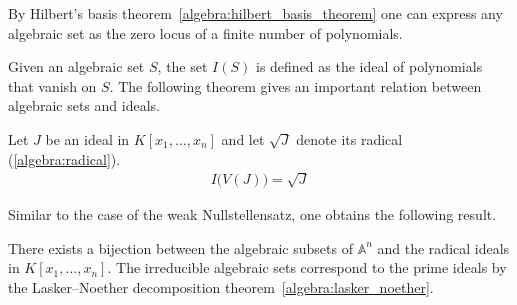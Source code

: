     \begin{property}
        By Hilbert's basis theorem~\ref{algebra:hilbert_basis_theorem} one can express any algebraic set as the zero locus of a finite number of polynomials.
    \end{property}

    Given an algebraic set $S$, the set $I(S)$ is defined as the ideal of polynomials that vanish on $S$. The following theorem gives an important relation between algebraic sets and ideals.
    \begin{theorem}
        Let $J$ be an ideal in $K[x_1,\ldots,x_n]$ and let $\sqrt{J}$ denote its radical (\cref{algebra:radical}).
        \begin{gather}
            I\bigl(V(J)\bigr) = \sqrt{J}
        \end{gather}
    \end{theorem}
    Similar to the case of the weak Nullstellensatz, one obtains the following result.
    \begin{result}
        There exists a bijection between the algebraic subsets of $\mathbb{A}^n$ and the radical ideals in $K[x_1,\ldots,x_n]$. The irreducible algebraic sets correspond to the prime ideals by the Lasker--Noether decomposition theorem~\ref{algebra:lasker_noether}.
    \end{result}


